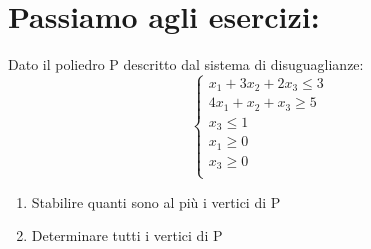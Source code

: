 \section{Passiamo agli esercizi:} Dato il poliedro P descritto dal sistema di disuguaglianze:
\begin{equation*}
    \begin{cases}
        \text{$x_1 + 3x_2 + 2x_3 \leq 3$}\\
        \text{$4x_1 + x_2 + x_3 \geq 5$}\\
        \text{$x_3 \leq 1$}\\
        \text{$x_1 \geq 0$}\\
        \text{$x_3 \geq 0$}\\
    \end{cases}
\end{equation*}
\begin{enumerate}
    \item Stabilire quanti sono al più i vertici di P
    \item Determinare tutti i vertici di P
\end{enumerate}

